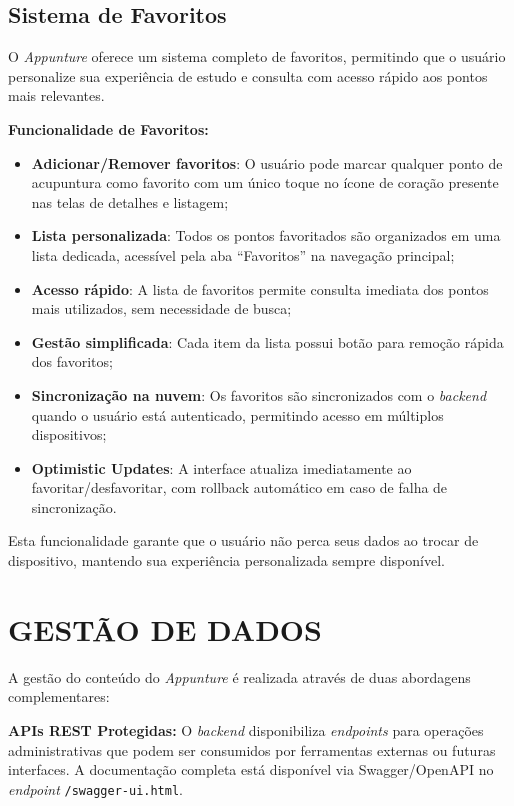 \subsection{Sistema de Favoritos}

O \textit{Appunture} oferece um sistema completo de favoritos, permitindo que o usuário personalize sua experiência de estudo e consulta com acesso rápido aos pontos mais relevantes.

\textbf{Funcionalidade de Favoritos:}
\begin{itemize}
    \item \textbf{Adicionar/Remover favoritos}: O usuário pode marcar qualquer ponto de acupuntura como favorito com um único toque no ícone de coração presente nas telas de detalhes e listagem;
    \item \textbf{Lista personalizada}: Todos os pontos favoritados são organizados em uma lista dedicada, acessível pela aba ``Favoritos'' na navegação principal;
    \item \textbf{Acesso rápido}: A lista de favoritos permite consulta imediata dos pontos mais utilizados, sem necessidade de busca;
    \item \textbf{Gestão simplificada}: Cada item da lista possui botão para remoção rápida dos favoritos;
    \item \textbf{Sincronização na nuvem}: Os favoritos são sincronizados com o \textit{backend} quando o usuário está autenticado, permitindo acesso em múltiplos dispositivos;
    \item \textbf{Optimistic Updates}: A interface atualiza imediatamente ao favoritar/desfavoritar, com rollback automático em caso de falha de sincronização.
\end{itemize}

Esta funcionalidade garante que o usuário não perca seus dados ao trocar de dispositivo, mantendo sua experiência personalizada sempre disponível.

\section{GESTÃO DE DADOS} \label{sec:admin}

A gestão do conteúdo do \textit{Appunture} é realizada através de duas abordagens complementares:

\textbf{APIs REST Protegidas:} O \textit{backend} disponibiliza \textit{endpoints} para operações administrativas que podem ser consumidos por ferramentas externas ou futuras interfaces. A documentação completa está disponível via Swagger/OpenAPI no \textit{endpoint} \texttt{/swagger-ui.html}.

